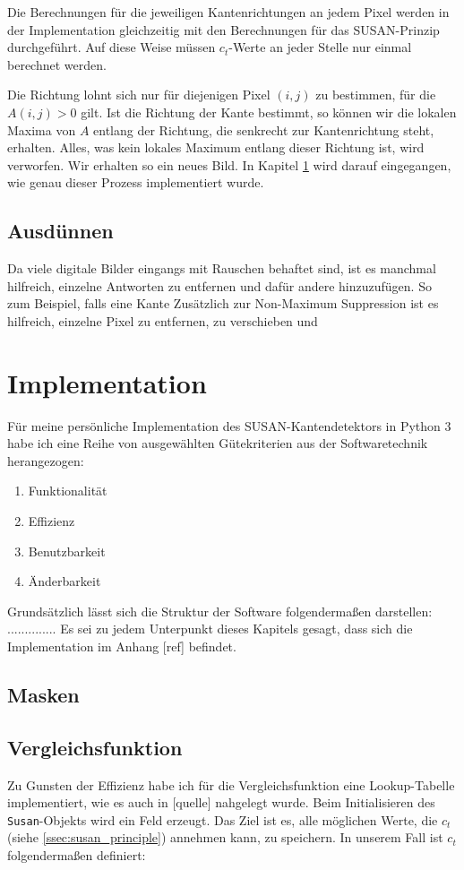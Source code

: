 \documentclass[a4paper, 11pt]{report}
\theoremstyle{definition}
\begin{document}
			Die Berechnungen für die jeweiligen Kantenrichtungen an jedem Pixel werden in der Implementation gleichzeitig mit den Berechnungen für das SUSAN-Prinzip durchgeführt. Auf diese Weise müssen $c_t$-Werte an jeder Stelle nur einmal berechnet werden.

			Die Richtung lohnt sich nur für diejenigen Pixel $(i,j)$ zu bestimmen, für die $A(i,j) > 0$ gilt. Ist die Richtung der Kante bestimmt, so können wir die lokalen Maxima von $A$ entlang der Richtung, die senkrecht zur Kantenrichtung steht, erhalten. Alles, was kein lokales Maximum entlang dieser Richtung ist, wird verworfen. Wir erhalten so ein neues Bild. In Kapitel \ref{sec:implementation} wird darauf eingegangen, wie genau dieser Prozess implementiert wurde.

		\subsection{Ausdünnen}
			Da viele digitale Bilder eingangs mit Rauschen behaftet sind, ist es manchmal hilfreich, einzelne Antworten zu entfernen und dafür andere hinzuzufügen. So zum Beispiel, falls eine Kante 
			Zusätzlich zur Non-Maximum Suppression ist es hilfreich, einzelne Pixel zu entfernen, zu verschieben und 


		\section{Implementation}\label{sec:implementation}
		Für meine persönliche Implementation des SUSAN-Kantendetektors in Python 3 habe ich eine Reihe von ausgewählten Gütekriterien aus der Softwaretechnik herangezogen:
			\begin{enumerate}
				\item Funktionalität
				\item Effizienz
				\item Benutzbarkeit
				\item Änderbarkeit
			\end{enumerate}
		Grundsätzlich lässt sich die Struktur der Software folgendermaßen darstellen: ..............
		Es sei zu jedem Unterpunkt dieses Kapitels gesagt, dass sich die Implementation im Anhang [ref] befindet.
		
			\subsection{Masken}


			\subsection{Vergleichsfunktion}
				Zu Gunsten der Effizienz habe ich für die Vergleichsfunktion eine Lookup-Tabelle implementiert, wie es auch in [quelle] nahgelegt wurde. Beim Initialisieren des \texttt{Susan}-Objekts wird ein Feld erzeugt. Das Ziel ist es, alle möglichen Werte, die $c_t$ (siehe \ref{ssec:susan_principle}) annehmen kann, zu speichern.
				In unserem Fall ist $c_t$ folgendermaßen definiert:
				
\end{document}
